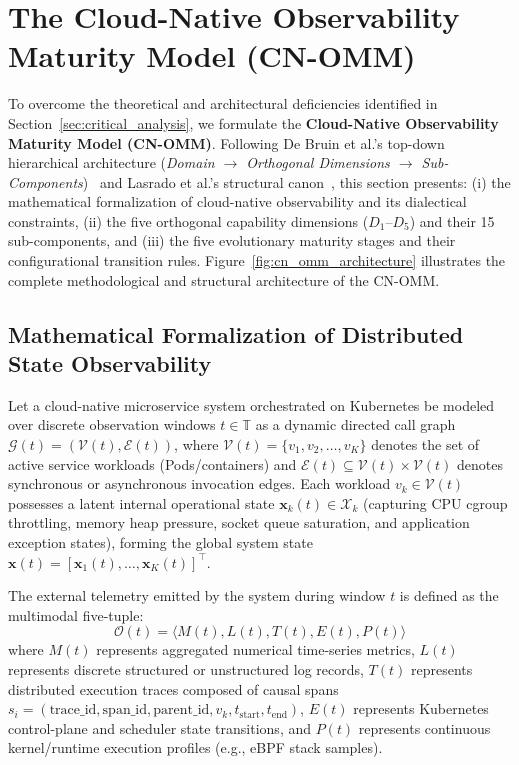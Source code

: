 \section{The Cloud-Native Observability Maturity Model (CN-OMM)}
\label{sec:cn_omm}

To overcome the theoretical and architectural deficiencies identified in Section~\ref{sec:critical_analysis}, we formulate the \textbf{Cloud-Native Observability Maturity Model (CN-OMM)}. Following De Bruin et al.'s top-down hierarchical architecture (\textit{Domain $\rightarrow$ Orthogonal Dimensions $\rightarrow$ Sub-Components})~\cite{debruin_2005} and Lasrado et al.'s structural canon~\cite{lasrado_2015}, this section presents: (i) the mathematical formalization of cloud-native observability and its dialectical constraints, (ii) the five orthogonal capability dimensions ($D_1$--$D_5$) and their 15 sub-components, and (iii) the five evolutionary maturity stages and their configurational transition rules. Figure~\ref{fig:cn_omm_architecture} illustrates the complete methodological and structural architecture of the CN-OMM.



\subsection{Mathematical Formalization of Distributed State Observability}
\label{subsec:math_formalization}

Let a cloud-native microservice system orchestrated on Kubernetes be modeled over discrete observation windows $t \in \mathbb{T}$ as a dynamic directed call graph $\mathcal{G}(t) = (\mathcal{V}(t), \mathcal{E}(t))$, where $\mathcal{V}(t) = \{v_1, v_2, \dots, v_K\}$ denotes the set of active service workloads (Pods/containers) and $\mathcal{E}(t) \subseteq \mathcal{V}(t) \times \mathcal{V}(t)$ denotes synchronous or asynchronous invocation edges. Each workload $v_k \in \mathcal{V}(t)$ possesses a latent internal operational state $\mathbf{x}_k(t) \in \mathcal{X}_k$ (capturing CPU cgroup throttling, memory heap pressure, socket queue saturation, and application exception states), forming the global system state $\mathbf{x}(t) = [\mathbf{x}_1(t), \dots, \mathbf{x}_K(t)]^\top$.

The external telemetry emitted by the system during window $t$ is defined as the multimodal five-tuple:
\begin{equation}
    \mathcal{O}(t) = \langle M(t), L(t), T(t), E(t), P(t) \rangle
    \label{eq:telemetry_tuple}
\end{equation}
where $M(t)$ represents aggregated numerical time-series metrics, $L(t)$ represents discrete structured or unstructured log records, $T(t)$ represents distributed execution traces composed of causal spans $s_i = (\text{trace\_id}, \text{span\_id}, \text{parent\_id}, v_k, t_{\text{start}}, t_{\text{end}})$, $E(t)$ represents Kubernetes control-plane and scheduler state transitions, and $P(t)$ represents continuous kernel/runtime execution profiles (e.g., eBPF stack samples).

